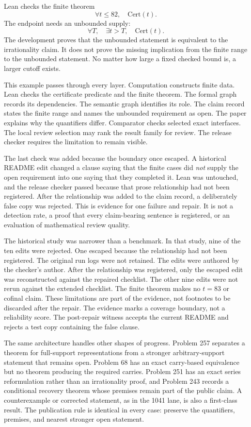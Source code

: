 \documentclass[10pt]{article}
\begin{document}
Lean checks the finite theorem
\[
\forall t\le82,\quad \mathrm{Cert}(t).
\]
The endpoint needs an unbounded supply:
\[
\forall T,\quad \exists t>T,\quad \mathrm{Cert}(t).
\]
The development proves that the unbounded statement is equivalent to the
irrationality claim. It does not prove the missing implication from the finite
range to the unbounded statement. No matter how large a fixed checked bound is,
a larger cutoff exists.

This example passes through every layer. Computation constructs finite data.
Lean checks the certificate predicate and the finite theorem. The formal graph
records its dependencies. The semantic graph identifies its role. The claim
record states the finite range and names the unbounded requirement as open.
The paper explains why the quantifiers differ. Comparator checks selected exact
interfaces. The local review selection may rank the result family for review. The release checker
requires the limitation to remain visible.

The last check was added because the boundary once escaped. A historical README
edit changed a clause saying that the finite cases did \emph{not} supply the
open requirement into one saying that they completed it. Lean was untouched,
and the release checker passed because that prose relationship had not been
registered. After the relationship was added to the claim record, a deliberately
false copy was rejected. This is evidence for one failure and repair. It is not
a detection rate, a proof that every claim-bearing sentence is registered, or
an evaluation of mathematical review quality.

The historical study was narrower than a benchmark. In that study, nine of the
ten edits were rejected. One escaped because the relationship had not been registered. The
original run logs were not retained. The edits were authored by the checker's
author. After the relationship was registered, only the escaped edit was
reconstructed against the repaired checklist. The other nine edits were not
rerun against the extended checklist. The finite theorem makes no
\(t=83\) or cofinal claim. These limitations are part of the evidence, not
footnotes to be discarded after the repair.
The evidence marks a coverage boundary, not a reliability score.
The post-repair witness accepts the current README and
rejects a test copy containing the false clause.

The same architecture handles other shapes of progress. Problem 257 separates
a theorem for full-support representations from a stronger arbitrary-support
statement that remains open. Problem 68 has an exact carry-based equivalence
but no theorem producing the required carries. Problem 251 has an exact series
reformulation rather than an irrationality proof, and Problem 243 records a
conditional recovery theorem whose premises remain part of the public claim.
A counterexample or corrected statement, as in the 1041 lane, is also a
first-class result. The publication rule is identical in every case: preserve
the quantifiers, premises, and nearest stronger open statement.
\end{document}
